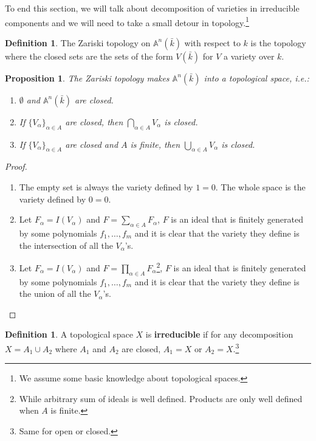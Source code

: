 \documentclass{tufte-handout} %
\newtheorem{prop}[thm]{Proposition}
\theoremstyle{definition}
\newtheorem{defn}[thm]{Definition}
\theoremstyle{remark}
\newcommand{\bA}{\mathbb{A}}
\begin{document}
To end this section, we will talk about decomposition of varieties in irreducible components and we will need to take a small detour in topology.\footnote{We assume some basic knowledge about topological spaces.}
\begin{defn}
	The Zariski topology on $\bA^n(\bar{k})$ with respect to $k$ is the topology where the closed sets are the sets of the form $V(\bar{k})$ for $V$ a variety over $k$.
\end{defn}
\begin{prop}
	The Zariski topology makes $\bA^n(\bar{k})$ into a topological space, i.e.:
	\begin{enumerate}
		\item $\emptyset$ and $\bA^n(\bar{k})$ are closed.
		\item If $\{V_{\alpha}\}_{\alpha \in A}$ are closed, then $\bigcap_{\alpha \in A} V_{\alpha}$ is closed.
		\item If $\{V_{\alpha}\}_{\alpha \in A}$ are closed and $A$ is finite, then $\bigcup_{\alpha \in A} V_{\alpha}$ is closed.
	\end{enumerate}
\end{prop}
\begin{proof}
	\begin{enumerate}
		\item The empty set is always the variety defined by $1 = 0$. The whole space is the variety defined by $0=0$.
		\item Let $F_{\alpha} = I(V_{\alpha})$ and $F = \sum_{\alpha \in A} F_{\alpha}$, $F$ is an ideal that is finitely generated by some polynomials $f_1, \dots, f_m$ and it is clear that the variety they define is the intersection of all the $V_{\alpha}$'s.
		\item Let $F_{\alpha} = I(V_{\alpha})$ and $F = \prod_{\alpha \in A} F_{\alpha}$\footnote{While arbitrary sum of ideals is well defined. Products are only well defined when $A$ is finite.  %
		}, $F$ is an ideal that is finitely generated by some polynomials $f_1, \dots, f_m$ and it is clear that the variety they define is the union of all the $V_{\alpha}$'s.
	\end{enumerate}
\end{proof}
\begin{defn}
	A topological space $X$ is \textbf{irreducible} if for any decomposition $X = A_1 \cup A_2$ where $A_1$ and $A_2$ are closed, $A_1 = X$ or $A_2 = X$.\footnote{Same for open or closed. %
	}
\end{defn}
\end{document}
